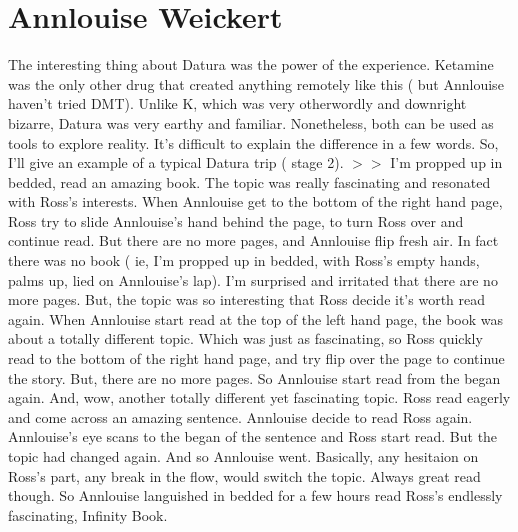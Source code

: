 \documentclass[12pt]{book}
\begin{document}
\chapter{Annlouise Weickert}

The interesting thing about Datura was the power of the experience. Ketamine was the only other drug that created anything remotely like this ( but Annlouise haven't tried DMT). Unlike K, which was very otherwordly and downright bizarre, Datura was very earthy and familiar. Nonetheless, both can be used as tools to explore reality. It's difficult to explain the difference in a few words. So, I'll give an example of a typical Datura trip ( stage 2). $>$$>$ I'm propped up in bedded, read an amazing book. The topic was really fascinating and resonated with Ross's interests. When Annlouise get to the bottom of the right hand page, Ross try to slide Annlouise's hand behind the page, to turn Ross over and continue read. But there are no more pages, and Annlouise flip fresh air. In fact there was no book ( ie, I'm propped up in bedded, with Ross's empty hands, palms up, lied on Annlouise's lap). I'm surprised and irritated that there are no more pages. But, the topic was so interesting that Ross decide it's worth read again. When Annlouise start read at the top of the left hand page, the book was about a totally different topic. Which was just as fascinating, so Ross quickly read to the bottom of the right hand page, and try flip over the page to continue the story. But, there are no more pages. So Annlouise start read from the began again. And, wow, another totally different yet fascinating topic. Ross read eagerly and come across an amazing sentence. Annlouise decide to read Ross again. Annlouise's eye scans to the began of the sentence and Ross start read. But the topic had changed again. And so Annlouise went. Basically, any hesitaion on Ross's part, any break in the flow, would switch the topic. Always great read though. So Annlouise languished in bedded for a few hours read Ross's endlessly fascinating, Infinity Book.
\end{document}
